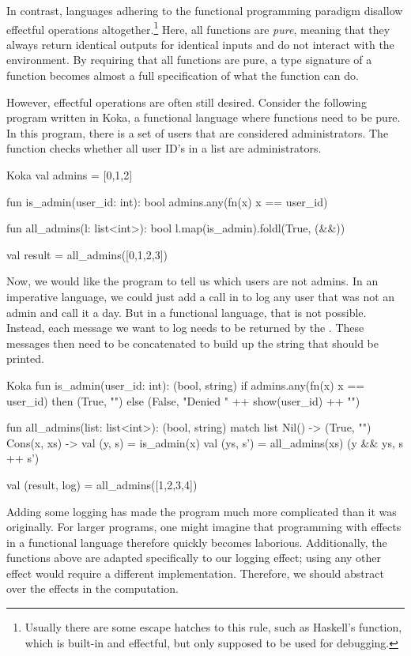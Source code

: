 In contrast, languages adhering to the functional programming paradigm disallow effectful operations altogether.\footnote{Usually there are some escape hatches to this rule, such as Haskell's  function, which is built-in and effectful, but only supposed to be used for debugging.} Here, all functions are \emph{pure}, meaning that they always return identical outputs for identical inputs and do not interact with the environment. By requiring that all functions are pure, a type signature of a function becomes almost a full specification of what the function can do.

However, effectful operations are often still desired. Consider the following program written in Koka, a functional language where functions need to be pure. In this program, there is a set of users that are considered administrators. The  function checks whether all user ID's in a list are administrators.

\begin{lst}{Koka}
val admins = [0,1,2]

fun is_admin(user_id: int): bool
  admins.any(fn(x) x == user_id)

fun all_admins(l: list<int>): bool
  l.map(is_admin).foldl(True, (&&))

val result = all_admins([0,1,2,3])    
\end{lst}
%
Now, we would like the program to tell us which users are not admins. In an imperative language, we could just add a  call in  to log any user that was not an admin and call it a day. But in a functional language, that is not possible. Instead, each message we want to log needs to be returned by the . These messages then need to be concatenated to build up the string that should be printed.

\begin{lst}{Koka}
fun is_admin(user_id: int): (bool, string)
  if admins.any(fn(x) x == user_id)
  then (True, "")
  else (False, "Denied " ++ show(user_id) ++ "\n")

fun all_admins(list: list<int>): (bool, string)
  match list
    Nil() -> (True, "")
    Cons(x, xs) ->
      val (y, s) = is_admin(x)
      val (ys, s') = all_admins(xs)
      (y && ys, s ++ s')

val (result, log) = all_admins([1,2,3,4])
\end{lst}
Adding some logging has made the program much more complicated than it was originally. For larger programs, one might imagine that programming with effects in a functional language therefore quickly becomes laborious. Additionally, the functions above are adapted specifically to our logging effect; using any other effect would require a different implementation. Therefore, we should abstract over the effects in the computation.

